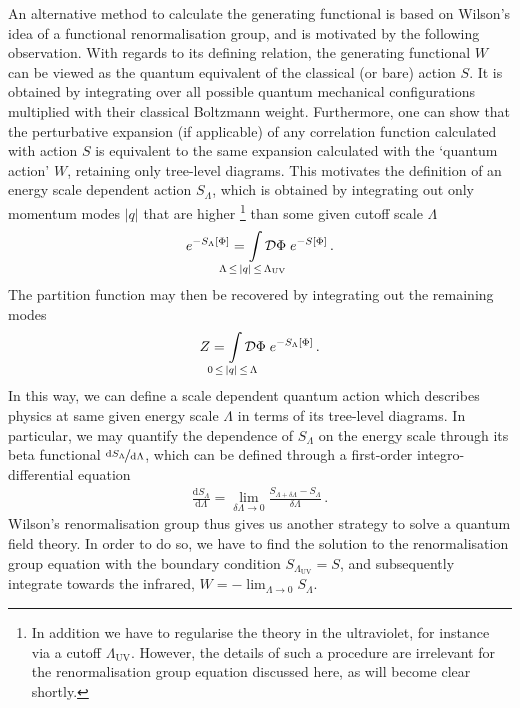 \documentclass[11pt]{book}
\newcommand{\LambdaUV}{ \Lambda_{\scriptscriptstyle{\mathrm{UV}}} }
\newcommand{\SLambda}{ S_{\scriptscriptstyle{\Lambda}} }
\numberwithin{equation}{chapter}
\begin{document}
An alternative method to calculate the generating functional is based
on Wilson's idea of a functional renormalisation group, and is motivated
by the following observation. With regards to its defining relation,
the generating functional $W$ can be viewed as the quantum equivalent
of the classical (or bare) action $S$.
It is obtained by integrating over all possible quantum mechanical
configurations multiplied with their classical Boltzmann weight.
Furthermore, one can show that the perturbative expansion
(if applicable) of any correlation function
calculated with action $S$ is equivalent to the same expansion
calculated with the `quantum action' $W$, retaining only tree-level
diagrams. This motivates the definition of an energy scale dependent
action $\SLambda$, which is obtained by integrating out
only momentum modes $|q|$ that are higher%
\footnote{%
  In addition we have to regularise the theory in the ultraviolet,
  for instance via a cutoff $\LambdaUV$. However, the details
  of such a procedure are irrelevant for the renormalisation group
  equation discussed here, as will become clear shortly.
}
than some given cutoff scale $\Lambda$
\begin{align}
  e^{ - \SLambda \lbrack \Phi \rbrack }
  = \smashoperator{ \int_{ \Lambda \, \leq \, |q| \, \leq \, \LambdaUV } }
  \mathcal D \Phi \;
  e^{-S \lbrack \Phi \rbrack} \,.
\end{align}
The partition function may then be recovered by integrating out
the remaining modes
\begin{align}
  Z
  = \smashoperator{ \int_{ 0 \, \leq \, |q| \, \leq \, \Lambda } }
  \mathcal D \Phi \;
  e^{-\SLambda \lbrack \Phi \rbrack} \,.
\end{align}
In this way, we can define a scale dependent quantum action which
describes physics at same given energy scale $\Lambda$ in terms of
its tree-level diagrams. In particular, we may quantify the dependence
of $\SLambda$ on the energy scale
through its beta functional $\nicefrac{ \mathrm d\SLambda }{ \mathrm d\Lambda }$,
which can be defined through a first-order integro-differential equation
\begin{align}
  \frac{ \mathrm d \SLambda }{ \mathrm d \Lambda }
  = \lim_{ \delta \Lambda \rightarrow 0 }
  \frac{ S_{\scriptscriptstyle{\Lambda+\delta\Lambda}} - \SLambda }{ \delta \Lambda } \,.
  \label{eq:wilsonRG}
\end{align}
Wilson's renormalisation group thus gives us another strategy to
solve a quantum field theory. In order to do so, we have to find the solution to
the renormalisation group equation with the boundary condition
$S_\LambdaUV = S$,
and subsequently integrate towards the infrared,
$W = - \lim_{\Lambda \rightarrow 0} \SLambda$.
\end{document}
